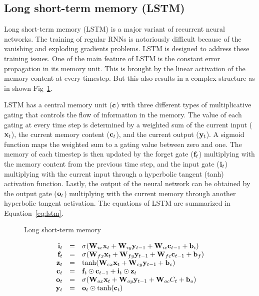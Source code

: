 \subsection{Long short-term memory (LSTM)}
Long short-term memory (LSTM) \cite{hochreiter97} is a major variant of recurrent neural networks. The training of regular RNNs is notoriously difficult because of the vanishing and exploding gradients problems. LSTM is designed to address these training issues. One of the main feature of LSTM is the constant error propagation in its memory unit. This is brought by the linear activation of the memory content at every timestep. But this also results in a complex structure as in shown Fig~\ref{fig:lstm}.

LSTM has a central memory unit ($\mathbf{c}$) with three different types of multiplicative gating that controls the flow of information in the memory. The value of each gating at every time step is determined by a weighted sum of the current input ($\mathbf{x}_t$), the current memory content ($\mathbf{c}_t$), and the current output ($\mathbf{y}_t$). A sigmoid function maps the weighted sum to a gating value between zero and one. The memory of each timestep is then updated by the forget gate ($\mathbf{f}_t$) multiplying with the memory content from the previous time step, and the input gate ($\mathbf{i}_t$) multiplying with the current input through a hyperbolic tangent (tanh) activation function. Lastly, the output of the neural network can be obtained by the output gate ($\mathbf{o}_t$) multiplying with the current memory through another hyperbolic tangent activation. The equations of LSTM are summarized in Equation~\ref{eq:lstm}.

\begin{figure}
\centering

\caption{Long short-term memory}
\label{fig:lstm}
\end{figure}

\begin{equation}
\label{eq:lstm}
    \begin{array}{r c l}
\mathbf{i}_t &=& \sigma(\mathbf{W}_{ix} \mathbf{x}_t + \mathbf{W}_{iy} \mathbf{y}_{t-1} + \mathbf{W}_{ic} \mathbf{c}_{t-1} + \mathbf{b}_i)\\
\mathbf{f}_t &=& \sigma(\mathbf{W}_{fx} \mathbf{x}_t + \mathbf{W}_{fy} \mathbf{y}_{t-1} + \mathbf{W}_{fc} \mathbf{c}_{t-1} + \mathbf{b}_f)\\
\mathbf{z}_t &=& \tanh(\mathbf{W}_{cx} \mathbf{x}_t + \mathbf{W}_{cy} \mathbf{y}_{t-1} + \mathbf{b}_c)\\
\mathbf{c}_t &=& \mathbf{f}_t \odot \mathbf{c}_{t-1} + \mathbf{i}_t \odot \mathbf{z}_t\\
\mathbf{o}_t &=& \sigma(\mathbf{W}_{ox} \mathbf{x}_t + \mathbf{W}_{oy} \mathbf{y}_{t-1} + \mathbf{W}_{oc} C_t + \mathbf{b}_o)\\
\mathbf{y}_t &=& \mathbf{o}_t \odot \tanh(\mathbf{c}_t)
    \end{array}
\end{equation}

